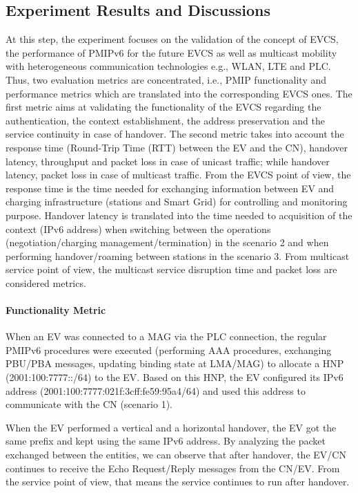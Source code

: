 \subsection{Experiment Results and Discussions}
At this step, the experiment focuses on the validation of the concept of EVCS, the performance of PMIPv6 for the future EVCS as well as multicast mobility with heterogeneous communication technologies e.g., WLAN, LTE and PLC. Thus, two evaluation metrics are concentrated, i.e., PMIP functionality and performance metrics which are translated into the corresponding EVCS ones. The first metric aims at validating the functionality of the EVCS regarding the authentication, the context establishment, the address preservation and the service continuity in case of handover. The second metric takes into account the response time (Round-Trip Time (RTT) between the EV and the CN), handover latency, throughput and packet loss in case of unicast traffic; while handover latency, packet loss in case of multicast traffic. From the EVCS point of view, the response time is the time needed for exchanging information between EV and charging infrastructure (stations and Smart Grid) for controlling and monitoring purpose. Handover latency is translated into the time needed to acquisition of the context (IPv6 address) when switching between the operations (negotiation/charging management/termination) in the scenario 2 and when performing handover/roaming between stations in the scenario 3. From multicast service point of view, the multicast service disruption time and packet loss are considered metrics. 

\paragraph{Functionality Metric}
When an EV was connected to a MAG via the PLC connection, the regular PMIPv6 procedures were executed (performing AAA procedures, exchanging PBU/PBA messages, updating binding state at LMA/MAG) to allocate a HNP (2001:100:7777::/64) to the EV. Based on this HNP, the EV configured its IPv6 address (2001:100:7777:021f:3cff:fe59:95a4/64) and used this address to communicate with the CN (scenario 1).

When the EV performed a vertical and a horizontal handover, the EV got the same prefix and kept using the same IPv6 address. By analyzing the packet exchanged between the entities, we can observe that after handover, the EV/CN continues to receive the Echo Request/Reply messages from the CN/EV. From the service point of view, that means the service continues to run after handover.   

